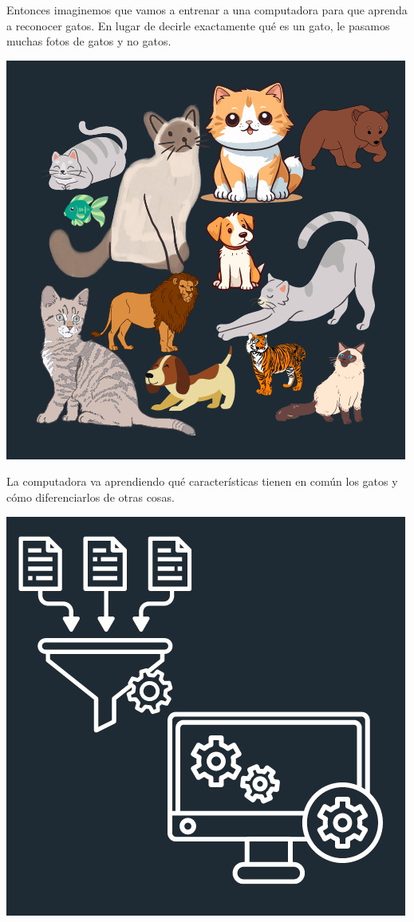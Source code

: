 Entonces imaginemos que vamos a entrenar a una computadora para que aprenda a reconocer gatos. 
En lugar de decirle exactamente qué es un gato, le pasamos muchas fotos de gatos y no gatos. 


\begin{center}
    \includegraphics[scale = .5]{assets/imagenes/modulo05/step01.png}
\end{center}


La computadora va aprendiendo qué características tienen en común los gatos y cómo 
diferenciarlos de otras cosas.


\begin{center}
    \includegraphics[scale = .5]{assets/imagenes/modulo05/step02.png}
\end{center}


